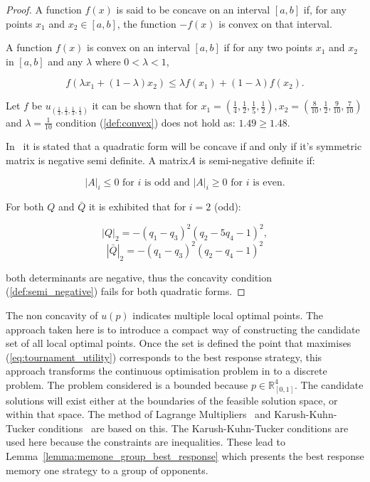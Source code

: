 \documentclass[10pt]{article}
\newcommand{\R}{\mathbb{R}}
\begin{document}
\begin{proof}
    A function \(f(x)\) is said to be concave on an interval \([a, b]\) if, for any
    points \(x_1\) and \(x_2 \in [a, b]\), the function \(-f(x)\) is convex on that
    interval.

    A function \(f(x)\) is convex on an interval \([a, b]\) if for any two
    points \(x_1\) and \(x_2\) in \([a, b]\) and any \(\lambda\) where \(0 < \lambda < 1\),

    \begin{equation}\label{def:convex}
    f (\lambda x_1 + (1 - \lambda )x_2 ) \leq \lambda f (x_1 ) + (1 - \lambda )f (x_2 ).
    \end{equation}

    Let \(f\) be
    \(u_{(\frac{1}{3}, \frac{1}{3}, \frac{1}{3}, \frac{1}{3})}\) it can be shown
    that
    for \(x_1 = (\frac{1}{4}, \frac{1}{2}, \frac{1}{5} , \frac{1}{2}),
    x_2 = (\frac{8}{10}, \frac{1}{2}, \frac{9}{10} , \frac{7}{10})\) and
    \(\lambda=\frac{1}{10}\)
    condition (\ref{def:convex}) does not hold as: \(1.49 \geq 1.48\).

    In~\cite{Anton2014} it is stated that a quadratic form will
    be concave if and only if it's symmetric matrix is negative semi definite.
    A matrix\(A\) is semi-negative definite if:

    \begin{equation}\label{def:semi_negative}
    |A|_i \leq 0 \text{ for } i \text{ is odd and } |A|_i \geq 0  \text{ for } i
    \text{ is even.}
    \end{equation}

    For both \(Q\) and \(\bar{Q}\) it is exhibited that for \(i=2\) (odd):

    \[|Q|_2 = - \left(q_{1} - q_{3}\right)^{2} \left(q_{2} - 5 q_{4} - 1\right)^{2},\]
    \[|\bar{Q}|_2 =- \left(q_{1} - q_{3}\right)^{2} \left(q_{2} - q_{4} - 1\right)^{2}\]

    both determinants are negative, thus the concavity condition
    (\ref{def:semi_negative})
    fails for both quadratic forms.
\end{proof}

The non concavity of \(u(p)\) indicates multiple local optimal points. The
approach taken here is to introduce a compact way of constructing the candidate
set of all local optimal points. Once the set is defined the point that
maximises (\ref{eq:tournament_utility}) corresponds to the best response
strategy, this approach transforms the continuous optimisation problem in to a
discrete problem. The problem considered is a bounded because \(p \in \R^4_{[0,
1]}\). The candidate solutions will exist either at the boundaries of the
feasible solution space, or within that space. The method of Lagrange
Multipliers~\cite{bertsekas2014} and Karush-Kuhn-Tucker
conditions~\cite{Giorgi2016} are based on this. The Karush-Kuhn-Tucker
conditions are used here because the constraints are inequalities.
These lead to Lemma~\ref{lemma:memone_group_best_response} which
presents the best response memory one strategy to a group of opponents.
\end{document}

